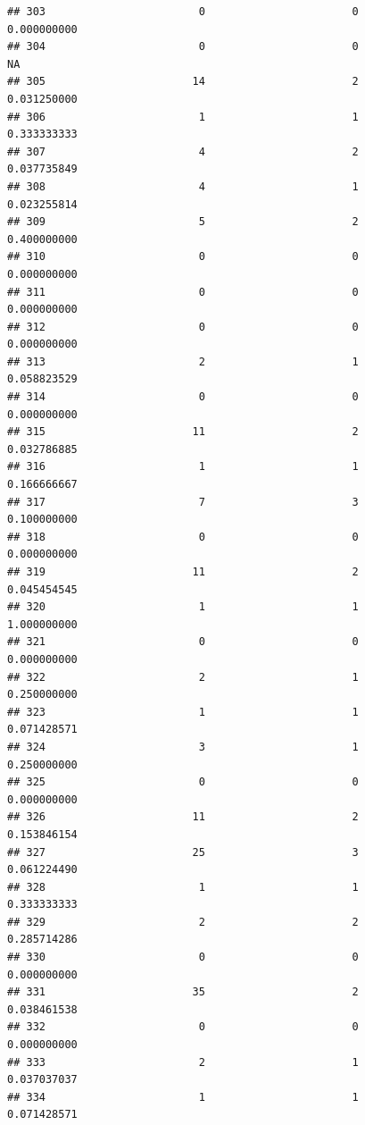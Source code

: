 \documentclass[
]{article}
\begin{document}
\begin{verbatim}
## 303                        0                       0               0.000000000
## 304                        0                       0                        NA
## 305                       14                       2               0.031250000
## 306                        1                       1               0.333333333
## 307                        4                       2               0.037735849
## 308                        4                       1               0.023255814
## 309                        5                       2               0.400000000
## 310                        0                       0               0.000000000
## 311                        0                       0               0.000000000
## 312                        0                       0               0.000000000
## 313                        2                       1               0.058823529
## 314                        0                       0               0.000000000
## 315                       11                       2               0.032786885
## 316                        1                       1               0.166666667
## 317                        7                       3               0.100000000
## 318                        0                       0               0.000000000
## 319                       11                       2               0.045454545
## 320                        1                       1               1.000000000
## 321                        0                       0               0.000000000
## 322                        2                       1               0.250000000
## 323                        1                       1               0.071428571
## 324                        3                       1               0.250000000
## 325                        0                       0               0.000000000
## 326                       11                       2               0.153846154
## 327                       25                       3               0.061224490
## 328                        1                       1               0.333333333
## 329                        2                       2               0.285714286
## 330                        0                       0               0.000000000
## 331                       35                       2               0.038461538
## 332                        0                       0               0.000000000
## 333                        2                       1               0.037037037
## 334                        1                       1               0.071428571

\end{verbatim}
\end{document}
